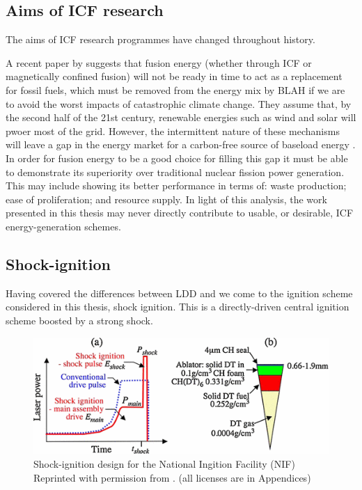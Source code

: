 \subsection{Aims of ICF research}

The aims of ICF research programmes have changed throughout history.

A recent paper by \citet{Nicholas2021} suggests that fusion energy (whether through ICF or magnetically confined fusion) will not be ready in time to act as a replacement for fossil fuels, which must be removed from the energy mix by BLAH if we are to avoid the worst impacts of catastrophic climate change. They assume that, by the second half of the 21st century, renewable energies such as wind and solar will pwoer most of the grid. However, the intermittent nature of these mechanisms will leave a gap in the energy market for a carbon-free source of baseload energy \citep{Nicholas2021}. In order for fusion energy to be a good choice for filling this gap it must be able to demonstrate its superiority over traditional nuclear fission power generation. This may include showing its better performance in terms of: waste production; ease of proliferation; and resource supply. In light of this analysis, the work presented in this thesis may never directly contribute to usable, or desirable, ICF energy-generation schemes.



\subsection{Shock-ignition}
Having covered the differences between \acrshort{LDD} and  \citep{Ribeyre2009} we come to the ignition scheme considered in this thesis, shock ignition. This is a directly-driven central ignition scheme boosted by a strong shock.

\begin{figure}
 \centering
 \includegraphics[width=0.8\columnwidth]{Chapters/C1_Introduction/SI_profile.png}
 \caption{Shock-ignition design for the National Ingition Facility (NIF) Reprinted with permission from \citep{Perkins2009}. (all licenses are in Appendices)} \label{fig:SI_laser}
\end{figure}


